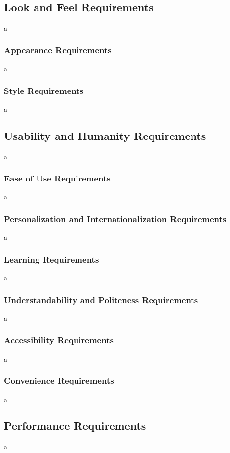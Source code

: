 \documentclass[12pt]{article}
\begin{document}
\subsection{Look and Feel Requirements}
a

\subsubsection{Appearance Requirements}
a

\subsubsection{Style Requirements}
a

\subsection{Usability and Humanity Requirements}
a

\subsubsection{Ease of Use Requirements}
a

\subsubsection{Personalization and Internationalization Requirements}
a

\subsubsection{Learning Requirements}
a

\subsubsection{Understandability and Politeness Requirements}
a

\subsubsection{Accessibility Requirements}
a

\subsubsection{Convenience Requirements}
a

\subsection{Performance Requirements}
a
\end{document}
